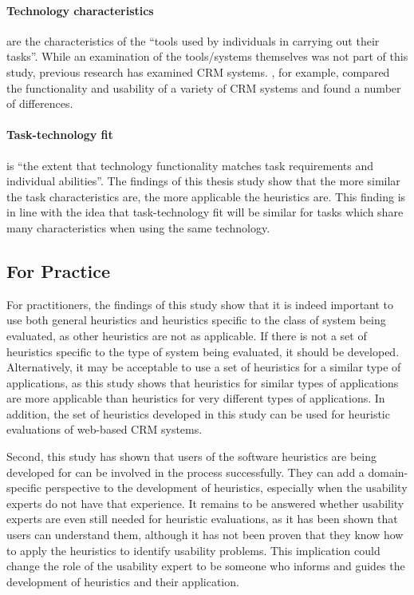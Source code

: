 \paragraph{Technology characteristics} are the characteristics of the ``tools used by individuals in carrying out their tasks''. While an examination of the tools/systems themselves was not part of this study, previous research has examined CRM systems. , for example, compared the functionality and usability of a variety of CRM systems and found a number of differences.

\paragraph{Task-technology fit} is ``the extent that technology functionality matches task requirements and individual abilities''. The findings of this thesis study show that the more similar the task characteristics are, the more applicable the heuristics are. This finding is in line with the idea that task-technology fit will be similar for tasks which share many characteristics when using the same technology.

\subsection{For Practice}
For practitioners, the findings of this study show that it is indeed important to use both general heuristics and heuristics specific to the class of system being evaluated, as other heuristics are not as applicable. If there is not a set of heuristics specific to the type of system being evaluated, it should be developed. Alternatively, it may be acceptable to use a set of heuristics for a similar type of applications, as this study shows that heuristics for similar types of applications are more applicable than heuristics for very different types of applications. In addition, the set of heuristics developed in this study can be used for heuristic evaluations of web-based CRM systems.

Second, this study has shown that users of the software heuristics are being developed for can be involved in the process successfully. They can add a domain-specific perspective to the development of heuristics, especially when the usability experts do not have that experience. It remains to be answered whether usability experts are even still needed for heuristic evaluations, as it has been shown that users can understand them, although it has not been proven that they know how to apply the heuristics to identify usability problems. This implication could change the role of the usability expert to be someone who informs and guides the development of heuristics and their application.

